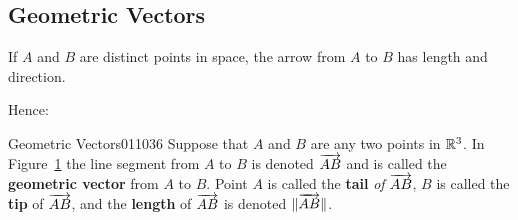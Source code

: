 \subsection*{Geometric Vectors}

If $A$ and $B$ are distinct points in space, the arrow from $A$ to $B$ has length and direction.

\begin{figure}[H]
\centering

\caption{\label{fig:011041}}
\end{figure}


Hence:
\begin{definition}{Geometric Vectors}{011036}
Suppose that $A$ and $B$ are any two points in $\mathbb{R}^3$. In Figure~\ref{fig:011041} the line segment from $A$ to $B$ is denoted $\overrightarrow{AB}$ and is called the \textbf{geometric vector} from $A$ to $B$. Point $A$ is called the \textbf{tail} \textit{of} $\overrightarrow{AB}$, $B$ is called the \textbf{tip} of $\overrightarrow{AB}$, and the \textbf{length} of $\overrightarrow{AB}$ is denoted $\| \overrightarrow{AB} \|$.
\end{definition}

\begin{wrapfigure}{l}{5cm} 
\centering

\caption{\label{fig:011048}}
\end{wrapfigure}

